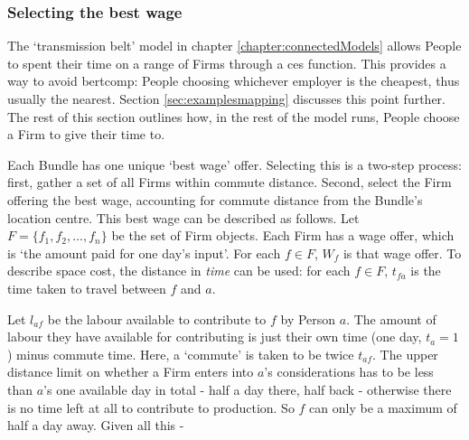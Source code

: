 \subsubsection{Selecting the best wage \label{sec:wageselect}}

The `transmission belt' model in chapter \ref{chapter:connectedModels} allows People to spent their time on a range of Firms through a \gls{ces} function. This provides a way to avoid \gls{bertcomp}: People choosing whichever employer is the cheapest, thus usually the nearest. Section \ref{sec:examplesmapping} discusses this point further. The rest of this section outlines how, in the rest of the model runs, People choose a Firm to give their time to. 

Each Bundle has one unique `best wage' offer. Selecting this is a two-step process: first, gather a set of all Firms within commute distance. Second, select the Firm offering the best wage, accounting for commute distance from the Bundle's location centre. This best wage can be described as follows. Let $F=\{f_{1},f_{2},...,f_{n}\}$ be the set of Firm objects. Each Firm has a wage offer, which is `the amount paid for one day's input'. For each $f\in F$, $W_{f}$ is that wage offer. To describe space cost, the distance in \emph{time} can be used: for each $f\in F$, $t_{fa}$ is the time taken to travel between $f$ and $a$. 

Let $l_{af}$ be the labour available to contribute to $f$ by Person $a$. The amount of labour they have available for contributing is just their own time (one day, $t_{a}=1$) minus commute time. Here, a `commute' is taken to be twice $t_{af}$. The upper distance limit on whether a Firm enters into $a$'s considerations has to be less than $a$'s one available day in total - half a day there, half back - otherwise there is no time left at all to contribute to production. So $f$ can only be a maximum of half a day away. Given all this -

